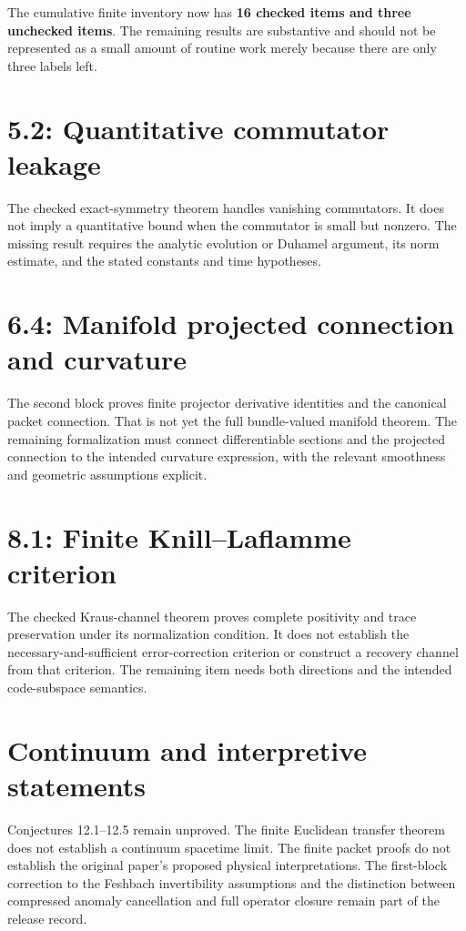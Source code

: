 \documentclass[10pt,letterpaper]{article}
\newcommand{\pageheading}[2]{\vspace*{2pt}{\small\color{ink}\textsc{#1}}\par\vspace{2pt}{\Large\bfseries #2}\par\vspace{4pt}}
\begin{document}
\newpage
\pageheading{Completion boundary}{Three finite items remain}
The cumulative finite inventory now has \textbf{16 checked items and three unchecked items}. The remaining results are substantive and should not be represented as a small amount of routine work merely because there are only three labels left.

\section*{5.2: Quantitative commutator leakage}
The checked exact-symmetry theorem handles vanishing commutators. It does not imply a quantitative bound when the commutator is small but nonzero. The missing result requires the analytic evolution or Duhamel argument, its norm estimate, and the stated constants and time hypotheses.

\section*{6.4: Manifold projected connection and curvature}
The second block proves finite projector derivative identities and the canonical packet connection. That is not yet the full bundle-valued manifold theorem. The remaining formalization must connect differentiable sections and the projected connection to the intended curvature expression, with the relevant smoothness and geometric assumptions explicit.

\section*{8.1: Finite Knill--Laflamme criterion}
The checked Kraus-channel theorem proves complete positivity and trace preservation under its normalization condition. It does not establish the necessary-and-sufficient error-correction criterion or construct a recovery channel from that criterion. The remaining item needs both directions and the intended code-subspace semantics.

\section*{Continuum and interpretive statements}
Conjectures 12.1--12.5 remain unproved. The finite Euclidean transfer theorem does not establish a continuum spacetime limit. The finite packet proofs do not establish the original paper's proposed physical interpretations. The first-block correction to the Feshbach invertibility assumptions and the distinction between compressed anomaly cancellation and full operator closure remain part of the release record.
\end{document}
